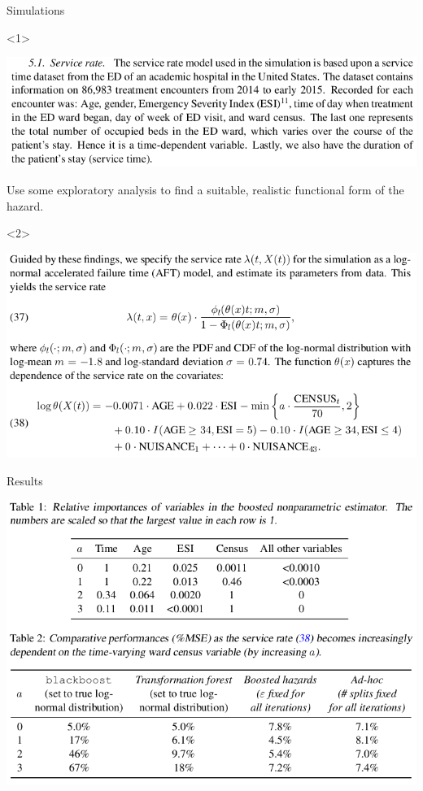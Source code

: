 \documentclass{beamer}\usepackage{listings}
\begin{document}
\begin{frame}[label={sec:org35b1ff2}]{Simulations}
\begin{onlyenv}<1>
\begin{center}
\includegraphics[width=.9\linewidth]{./screenshots/Screenshot_sim1.png}
\end{center}

Use some exploratory analysis to find a suitable, realistic functional form of the hazard.
\end{onlyenv}

\begin{onlyenv}<2>
\begin{center}
\includegraphics[width=.9\linewidth]{./screenshots/Screenshot_sim2.png}
\end{center}    
\end{onlyenv}
\end{frame}

\begin{frame}[label={sec:org7adeee3}]{Results}
\begin{center}
\includegraphics[width=.9\linewidth]{./screenshots/Screenshot_results.png}
\end{center} 
\end{frame}
\end{document}
